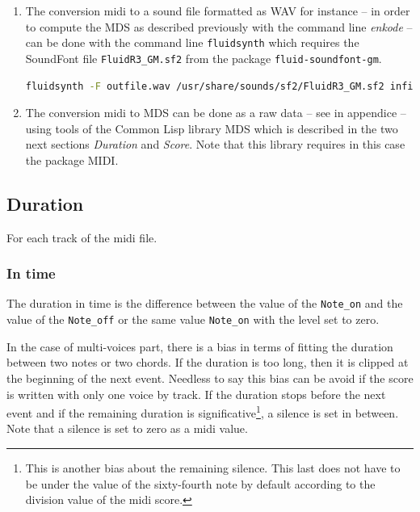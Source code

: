 \begin{enumerate}
\item The conversion midi to a sound file formatted as WAV for instance -- in order to compute the MDS as described previously with the command line \textsl{enkode} -- can be done with the command line \texttt{fluidsynth} which requires the SoundFont file \texttt{FluidR3\_GM.sf2} from the package \texttt{fluid-soundfont-gm}.
\begin{lstlisting}[language=bash]
fluidsynth -F outfile.wav /usr/share/sounds/sf2/FluidR3_GM.sf2 infile.mid
\end{lstlisting}
\item The conversion midi to MDS can be done as a raw data -- see \textsl{} in appendice  -- using tools of the Common Lisp library MDS which is described in the two next sections \textsl{Duration} and \textsl{Score}. Note that this library requires in this case the package MIDI. 

\end{enumerate}

\subsection{Duration}

For each track of the midi file.

\subsubsection{In time}

The duration in time is the difference between the value of the \texttt{Note\_on} and the value of the \texttt{Note\_off} or the same value \texttt{Note\_on} with the level set to zero.

In the case of multi-voices part, there is a bias in terms of fitting the duration between two notes or two chords. If the duration is too long, then it is clipped at the beginning of the next event. Needless to say this bias can be avoid if the score is written with only one voice by track. If the duration stops before the next event and if the remaining duration is significative\footnote{This is another bias about the remaining silence. This last does not have to be under the value of the sixty-fourth note
by default according to the division value of the midi score.}, a silence is set in between. Note that a silence is set to zero as a midi value.

